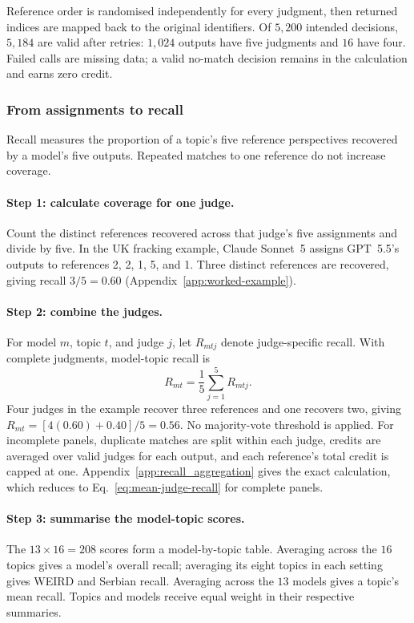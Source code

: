 \documentclass[11pt,a4paper]{article}
\begin{document}
Reference order is randomised independently for every judgment, then returned indices are mapped back to the original identifiers. Of $5{,}200$ intended decisions, $5{,}184$ are valid after retries: $1{,}024$ outputs have five judgments and $16$ have four. Failed calls are missing data; a valid no-match decision remains in the calculation and earns zero credit.

\subsubsection{From assignments to recall}
\label{sec:recall}
Recall measures the proportion of a topic's five reference perspectives recovered by a model's five outputs. Repeated matches to one reference do not increase coverage.

\paragraph{Step 1: calculate coverage for one judge.}
Count the distinct references recovered across that judge's five assignments and divide by five. In the UK fracking example, Claude Sonnet~5 assigns GPT~5.5's outputs to references 2, 2, 1, 5, and 1. Three distinct references are recovered, giving recall $3/5=0.60$ (Appendix~\ref{app:worked-example}).

\paragraph{Step 2: combine the judges.}
For model $m$, topic $t$, and judge $j$, let $R_{mtj}$ denote judge-specific recall. With complete judgments, model-topic recall is
\begin{equation}
R_{mt}=\frac{1}{5}\sum_{j=1}^{5}R_{mtj}.
\label{eq:mean-judge-recall}
\end{equation}
Four judges in the example recover three references and one recovers two, giving $R_{mt}=[4(0.60)+0.40]/5=0.56$. No majority-vote threshold is applied. For incomplete panels, duplicate matches are split within each judge, credits are averaged over valid judges for each output, and each reference's total credit is capped at one. Appendix~\ref{app:recall_aggregation} gives the exact calculation, which reduces to Eq.~\ref{eq:mean-judge-recall} for complete panels.

\paragraph{Step 3: summarise the model-topic scores.}
The $13\times16=208$ scores form a model-by-topic table. Averaging across the $16$ topics gives a model's overall recall; averaging its eight topics in each setting gives WEIRD and Serbian recall. Averaging across the $13$ models gives a topic's mean recall. Topics and models receive equal weight in their respective summaries.
\end{document}
